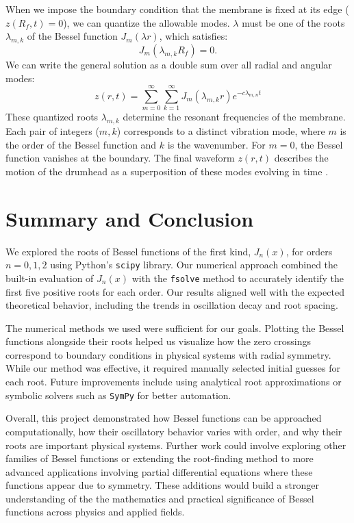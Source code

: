 \documentclass[linenumbers, twocolumn]{aastex631}
\begin{document}
\noindent When we impose the boundary condition that the membrane is fixed at
its edge ($z(R_f,t)=0$), we can quantize the allowable modes. $\lambda$
must be one of the roots $\lambda_{m,k}$ of the Bessel 
function $J_m(\lambda r)$, which satisfies:
\begin{equation}
    J_m(\lambda_{m,k}R_f)=0.
\end{equation}
\noindent We can write the general solution as a double sum over all radial and
angular modes:
\begin{equation}
    z(r,t)=\sum_{m=0}^\infty \sum_{k=1}^\infty J_m(\lambda_{m,k}r)e^{-c\lambda_{m,n}t}
\end{equation}
\noindent These quantized roots $\lambda_{m,k}$ determine the resonant frequencies
of the membrane. Each pair of integers ($m,k$) corresponds to a distinct
vibration mode, where $m$ is the order of the Bessel function and $k$ is the wavenumber.
For $m=0$, the Bessel function vanishes at the boundary. The final waveform
$z(r,t)$ describes the motion of the drumhead as a superposition of these modes evolving in time \cite{tamrin}.\\


\section{Summary and Conclusion} \label{sec:summary}

We explored the roots of Bessel functions of the first kind, 
$J_n(x)$, for orders $n=0,1,2$ using Python's \texttt{scipy} library. Our numerical
approach combined the built-in evaluation of $J_n(x)$ with the \texttt{fsolve}
method to accurately identify the first five positive roots for each order. Our
results aligned well with the expected theoretical behavior, including the trends
in oscillation decay and root spacing.

\noindent The numerical methods we used were sufficient for our goals.
Plotting the Bessel functions alongside their roots helped us visualize how the zero
crossings correspond to boundary conditions in physical systems with radial symmetry.
While our method was effective, it required manually selected initial guesses for
each root. Future improvements include using analytical root approximations or 
symbolic solvers such as \texttt{SymPy} for better automation.

\noindent Overall, this project demonstrated how Bessel functions can be approached
computationally, how their oscillatory behavior varies with order, and why their
roots are important physical systems. Further work could involve exploring other 
families of Bessel functions or extending the root-finding method to more
advanced applications involving partial differential equations where these functions
appear due to symmetry. These additions would build a stronger understanding of the
the mathematics and practical significance of Bessel functions across physics and
applied fields.\\
\end{document}
